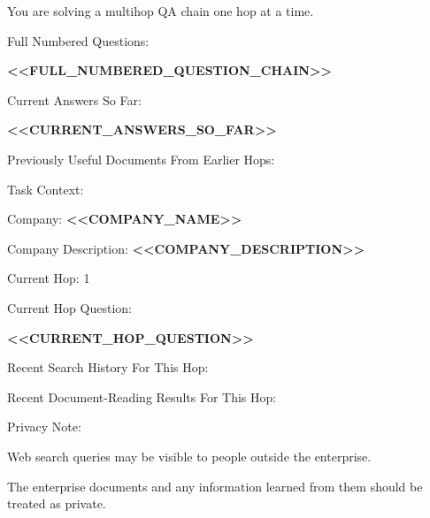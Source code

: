 \begin{tcolorbox}[colback=white, colframe=my-green, coltitle=black, parskip=5mm, title=\textbf{Hop Plan}, halign=flush left, enhanced, breakable, skin first=enhanced, skin middle=enhanced, skin last=enhanced]
\begin{scriptsize}
\ttfamily
\setlength{\parindent}{0pt}
You are solving a multihop QA chain one hop at a time.\par
\mbox{}\par
Full Numbered Questions:\par
\textcolor{my-green}{\textbf{\textless{}\textless{}FULL\_NUMBERED\_QUESTION\_CHAIN\textgreater{}\textgreater{}}}\par
\mbox{}\par
Current Answers So Far:\par
\textcolor{my-green}{\textbf{\textless{}\textless{}CURRENT\_ANSWERS\_SO\_FAR\textgreater{}\textgreater{}}}\par
\mbox{}\par
Previously Useful Documents From Earlier Hops:\par
[]\par
\mbox{}\par
Task Context:\par
Company: \textcolor{my-green}{\textbf{\textless{}\textless{}COMPANY\_NAME\textgreater{}\textgreater{}}}\par
Company Description: \textcolor{my-green}{\textbf{\textless{}\textless{}COMPANY\_DESCRIPTION\textgreater{}\textgreater{}}}\par
Current Hop: 1\par
Current Hop Question:\par
\textcolor{my-green}{\textbf{\textless{}\textless{}CURRENT\_HOP\_QUESTION\textgreater{}\textgreater{}}}\par
\mbox{}\par
Recent Search History For This Hop:\par
[]\par
\mbox{}\par
Recent Document-Reading Results For This Hop:\par
[]\par
\mbox{}\par
\mbox{}\par
Privacy Note:\par
Web search queries may be visible to people outside the enterprise.\par
The enterprise documents and any information learned from them should be treated as private.\par

\end{scriptsize}
\end{tcolorbox}
